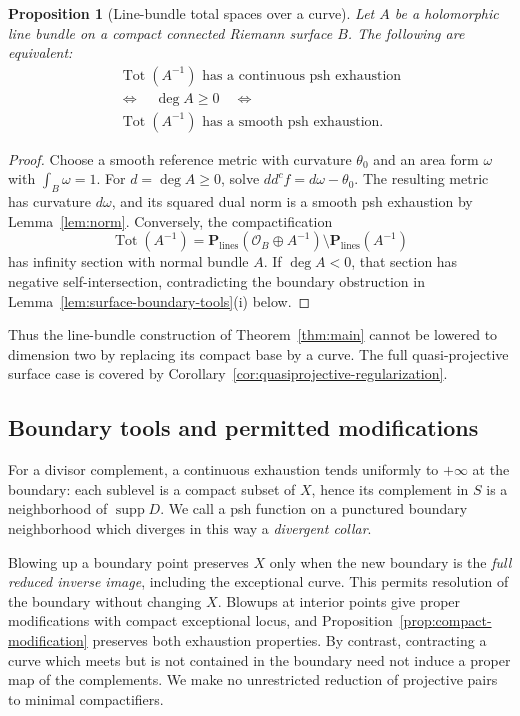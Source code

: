 \documentclass[11pt]{amsart}
\newtheorem{proposition}[theorem]{Proposition}
\theoremstyle{definition}
\theoremstyle{remark}
\numberwithin{equation}{section}
\newcommand{\PP}{\mathbf P}
\newcommand{\OO}{\mathcal O}
\newcommand{\Tot}{\operatorname{Tot}}
\newcommand{\ddc}{dd^c}
\newcommand{\supp}{\operatorname{supp}}
\begin{document}
\begin{proposition}[Line-bundle total spaces over a curve]
\label{cor:curve-total-space}
Let $A$ be a holomorphic line bundle on a compact connected Riemann
surface $B$. The following are equivalent:
\[
 \begin{gathered}
 \Tot(A^{-1})\text{ has a continuous psh exhaustion}\\
 \Longleftrightarrow\quad \deg A\ge0\quad\Longleftrightarrow\\
 \Tot(A^{-1})\text{ has a smooth psh exhaustion}.
 \end{gathered}
\]
\end{proposition}
\begin{proof}
Choose a smooth reference metric with curvature $\theta_0$ and an
area form $\omega$ with $\int_B\omega=1$. For $d=\deg A\ge0$, solve
$\ddc f=d\omega-\theta_0$. The resulting metric has curvature
$d\omega$, and its squared dual norm is a smooth psh exhaustion by
Lemma~\ref{lem:norm}. Conversely, the compactification
\[
 \Tot(A^{-1})=\PP_{\mathrm{lines}}(\OO_B\oplus A^{-1})
                 \setminus\PP_{\mathrm{lines}}(A^{-1})
\]
has infinity section with normal bundle $A$. If $\deg A<0$, that
section has negative self-intersection, contradicting the boundary
obstruction in Lemma~\ref{lem:surface-boundary-tools}\textup{(i)} below.
\end{proof}

Thus the line-bundle construction of Theorem~\ref{thm:main} cannot be
lowered to dimension two by replacing its compact base by a curve.
The full quasi-projective surface case is covered by
Corollary~\ref{cor:quasiprojective-regularization}.

\subsection{Boundary tools and permitted modifications}
\label{sec:surface-pair-reduction}

For a divisor complement, a continuous exhaustion tends uniformly to
$+\infty$ at the boundary: each sublevel is a compact subset of $X$,
hence its complement in $S$ is a neighborhood of $\supp D$. We call a
psh function on a punctured boundary neighborhood which diverges in
this way a \emph{divergent collar}.

Blowing up a boundary point preserves $X$ only when the new boundary
is the \emph{full reduced inverse image}, including the exceptional
curve. This permits resolution of the boundary without changing $X$.
Blowups at interior points give proper modifications with compact
exceptional locus, and Proposition~\ref{prop:compact-modification}
preserves both exhaustion properties. By contrast, contracting a curve
which meets but is not contained in the boundary need not induce a
proper map of the complements. We make no unrestricted reduction of
projective pairs to minimal compactifiers.
\end{document}

